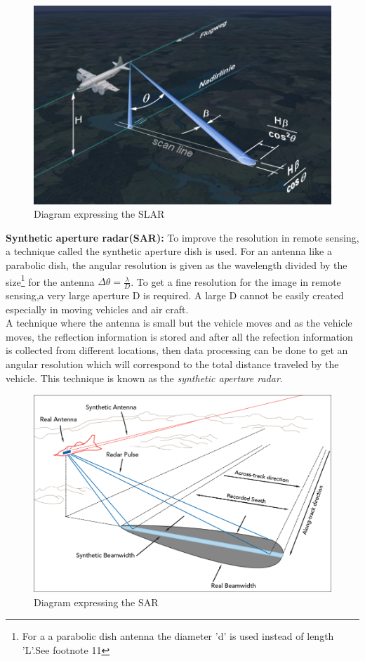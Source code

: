\begin{figure}[h]
\centering
\includegraphics[scale=0.2]{./graphics/SLAR-resolution}
\caption{Diagram expressing the SLAR}
\end{figure}
\textbf{Synthetic aperture radar(SAR):} To improve the resolution in remote sensing, a technique called the synthetic aperture dish is used. For an antenna like a parabolic dish, the angular resolution is given as the wavelength divided by the size\footnote{For a a parabolic dish antenna the diameter 'd' is used instead of length 'L'.See footnote 11} for the antenna $\Delta \theta = \frac{\lambda}{D}$. To get a fine resolution for the image in remote sensing,a very large aperture D is required. A large D cannot be easily created especially in moving vehicles and air craft.\\

A technique where the antenna is small but the vehicle moves and as the vehicle moves, the reflection information is stored and after all the refection information is collected from different locations, then data processing can be done to get an angular resolution which will correspond to the total distance traveled by the vehicle. This technique is known as the \textit{synthetic aperture radar}.
\begin{figure}[h]
\centering
\includegraphics[scale=0.3]{./graphics/sar2}
\caption{Diagram expressing the SAR}
\end{figure}

